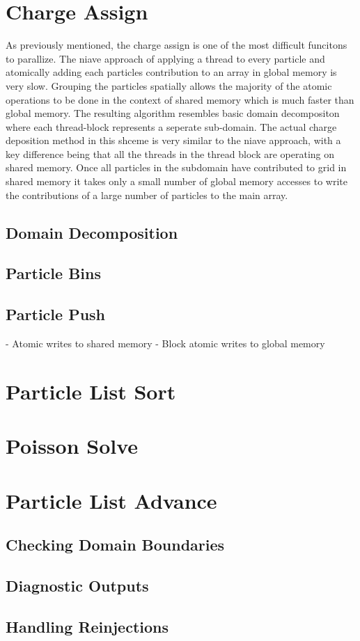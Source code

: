 	\section{Charge Assign}
	As previously mentioned, the charge assign is one of the most difficult funcitons to parallize. The niave approach of applying a thread to every particle and atomically adding each particles contribution to an array in global memory is very slow. Grouping the particles spatially allows the majority of the atomic operations to be done in the context of shared memory which is much faster than global memory. The resulting algorithm resembles basic domain decompositon where each thread-block represents a seperate sub-domain. The actual charge deposition method in this shceme is very similar to the niave approach, with a key difference being that all the threads in the thread block are operating on shared memory. Once all particles in the subdomain have contributed to grid in shared memory it takes only a small number of global memory accesses to write the contributions of a large number of particles to the main array. 

	\subsection{Domain Decomposition}

	\subsection{Particle Bins}
	\subsection{Particle Push}
		- Atomic writes to shared memory
		- Block atomic writes to global memory

	\section{Particle List Sort}


	\section{Poisson Solve}

	\section{Particle List Advance}

		\subsection{Checking Domain Boundaries}
		\subsection{Diagnostic Outputs}
		\subsection{Handling Reinjections}





